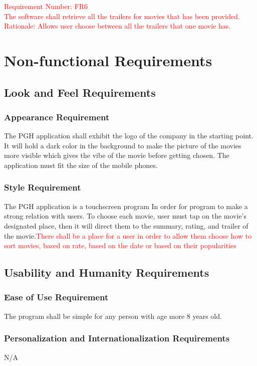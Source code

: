 \documentclass[12pt, titlepage]{article}
\begin{document}
\textcolor{red}{Requirement Number: FR6\\}
\textcolor{red}{The software shall retrieve all the trailers for movies that has been provided.\\}
\textcolor{red}{Rationale: Allows user choose between all the trailers that one movie has.\\}


\section{Non-functional Requirements}

\subsection{Look and Feel Requirements}
\subsubsection{Appearance Requirement}
The PGH application shall exhibit the logo of the company in the starting point. It will hold a dark color in the background to make the picture of the movies more visible which gives the vibe of the movie before getting chosen. The application must fit the size of the mobile phones. 

\subsubsection{Style Requirement}
The PGH application is a touchscreen program In order for program to make a strong relation with users. To choose each movie, user must tap on the movie’s designated place, then it will direct them to the summary, rating, and trailer of the movie.\textcolor{red}{There shall be a place for a user in order to allow them choose how to sort movies, based on rate, based on the date or based on their popularities}


\subsection{Usability and Humanity Requirements}
\subsubsection{Ease of Use Requirement}
The program shall be simple for any person with age more 8 years old. 

\subsubsection{Personalization and Internationalization Requirements}
N/A
\end{document}

